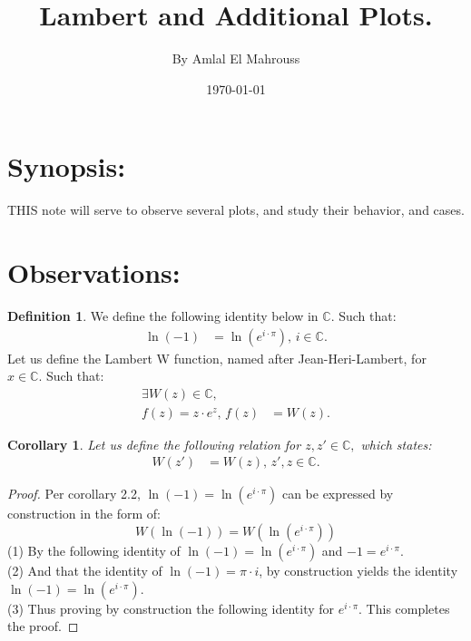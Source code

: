 \documentclass[10pt]{article}
\title{%
	\vspace{-1.5em}%
	\large\textbf{Lambert and Additional Plots.}%
}
\author{By Amlal El Mahrouss}
\date{\today}
\theoremstyle{plain}
\newtheorem{corollary}[theorem]{Corollary}
\theoremstyle{definition}
\newtheorem{definition}[theorem]{Definition}
\theoremstyle{remark}
\begin{document}

\maketitle
\tableofcontents
\newpage

\section{Synopsis:}

\lettrine[lines=1, lhang=0.1, loversize=0.2]{T}HIS note will serve to observe several plots, and study their behavior, and cases.

\section{Observations:}

\begin{definition}
	We define the following identity below in $\mathbb{C}.$ Such that:
	\begin{align*}
		\ln(-1)&=\ln(e^{i \cdot \pi}), \, i \in \mathbb{C}.
	\end{align*}
	Let us define the Lambert W function, named after Jean-Heri-Lambert, for $x \in \mathbb{C}.$ Such that:
	\begin{align*}
		\exists W(z) \in \mathbb{C},\\
		f(z) = z \cdot e^{z}, \, f(z) &= W(z).
	\end{align*}
\end{definition}

\begin{corollary}
	Let us define the following relation for $z, z' \in \mathbb{C},$ which states:
	\begin{align*}
		W(z') &= W(z), \, z', z \in \mathbb{C}.
	\end{align*}
\end{corollary}

\begin{proof}
	Per corollary 2.2, $\ln(-1)=\ln(e^{i \cdot \pi})$ can be expressed by construction in the form of:
	\begin{equation}
		W(\ln(-1)) = W(\ln(e^{i \cdot \pi}))
	\end{equation}
	(1) By the following identity of $\ln(-1)=\ln(e^{i \cdot \pi})$ and $-1 = e^{i \cdot \pi}.$\\
	(2) And that the identity of $\ln(-1) = \pi \cdot i$, by construction yields the identity $\ln(-1) = \ln(e^{i \cdot \pi}).$\\
	(3) Thus proving by construction the following identity for $e^{i \cdot \pi}$. This completes the proof.
\end{proof}
\end{document}
